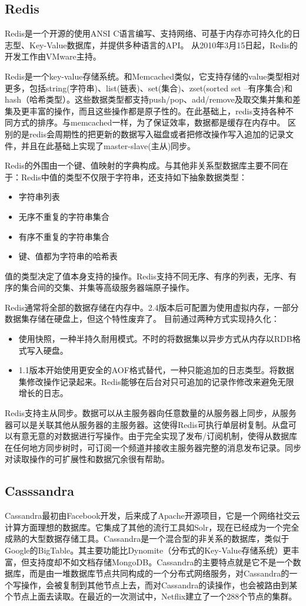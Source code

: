 \subsection{Redis}
Redis是一个开源的使用ANSI C语言编写、支持网络、可基于内存亦可持久化的日志型、Key-Value数据库，并提供多种语言的API。
从2010年3月15日起，Redis的开发工作由VMware主持。

Redis是一个key-value存储系统。和Memcached类似，它支持存储的value类型相对更多，包括string(字符串)、list(链表)、set(集合)、zset(sorted set --有序集合)和hash（哈希类型）。这些数据类型都支持push/pop、add/remove及取交集并集和差集及更丰富的操作，而且这些操作都是原子性的。在此基础上，redis支持各种不同方式的排序。与memcached一样，为了保证效率，数据都是缓存在内存中。
区别的是redis会周期性的把更新的数据写入磁盘或者把修改操作写入追加的记录文件，并且在此基础上实现了master-slave(主从)同步。

Redis的外围由一个键、值映射的字典构成。与其他非关系型数据库主要不同在于：Redis中值的类型不仅限于字符串，还支持如下抽象数据类型：
\begin{itemize}
\item 字符串列表
\item 无序不重复的字符串集合
\item 有序不重复的字符串集合
\item 键、值都为字符串的哈希表
\end{itemize}
值的类型决定了值本身支持的操作。Redis支持不同无序、有序的列表，无序、有序的集合间的交集、并集等高级服务器端原子操作。

Redis通常将全部的数据存储在内存中。2.4版本后可配置为使用虚拟内存，一部分数据集存储在硬盘上，但这个特性废弃了。
目前通过两种方式实现持久化：
\begin{itemize}
\item 使用快照，一种半持久耐用模式。不时的将数据集以异步方式从内存以RDB格式写入硬盘。
\item 1.1版本开始使用更安全的AOF格式替代，一种只能追加的日志类型。将数据集修改操作记录起来。Redis能够在后台对只可追加的记录作修改来避免无限增长的日志。
\end{itemize}


Redis支持主从同步。数据可以从主服务器向任意数量的从服务器上同步，从服务器可以是关联其他从服务器的主服务器。这使得Redis可执行单层树复制。从盘可以有意无意的对数据进行写操作。由于完全实现了发布/订阅机制，使得从数据库在任何地方同步树时，可订阅一个频道并接收主服务器完整的消息发布记录。同步对读取操作的可扩展性和数据冗余很有帮助。


\subsection{Casssandra}
Cassandra最初由Facebook开发，后来成了Apache开源项目，它是一个网络社交云计算方面理想的数据库。它集成了其他的流行工具如Solr，现在已经成为一个完全成熟的大型数据存储工具。Cassandra是一个混合型的非关系的数据库，类似于Google的BigTable。其主要功能比Dynomite（分布式的Key-Value存储系统）更丰富，但支持度却不如文档存储MongoDB。Cassandra的主要特点就是它不是一个数据库，而是由一堆数据库节点共同构成的一个分布式网络服务，对Cassandra的一个写操作，会被复制到其他节点上去，而对Cassandra的读操作，也会被路由到某个节点上面去读取。在最近的一次测试中，Netflix建立了一个288个节点的集群。

